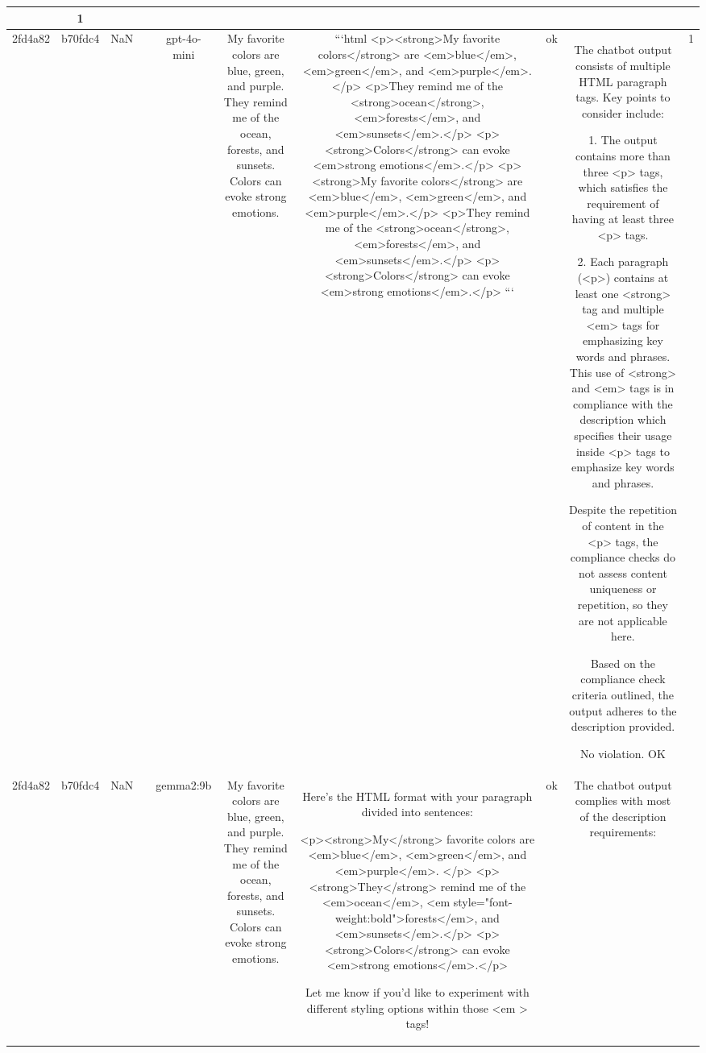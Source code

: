 \begin{table}[h!]
\begin{tabular}{|c|c|c|c|c|c|c|c|c|c|}
{{ERR & 1\\
\hline
2fd4a82 & b70fdc4 & NaN &  & gpt-4o-mini & My favorite colors are blue, green, and purple. They remind me of the ocean, forests, and sunsets. Colors can evoke strong emotions. & ```html
<p><strong>My favorite colors</strong> are <em>blue</em>, <em>green</em>, and <em>purple</em>.</p>
<p>They remind me of the <strong>ocean</strong>, <em>forests</em>, and <em>sunsets</em>.</p>
<p><strong>Colors</strong> can evoke <em>strong emotions</em>.</p>
<p><strong>My favorite colors</strong> are <em>blue</em>, <em>green</em>, and <em>purple</em>.</p>
<p>They remind me of the <strong>ocean</strong>, <em>forests</em>, and <em>sunsets</em>.</p>
<p><strong>Colors</strong> can evoke <em>strong emotions</em>.</p>
``` & ok & The chatbot output consists of multiple HTML paragraph tags. Key points to consider include:

1. The output contains more than three <p> tags, which satisfies the requirement of having at least three <p> tags.

2. Each paragraph (<p>) contains at least one <strong> tag and multiple <em> tags for emphasizing key words and phrases. This use of <strong> and <em> tags is in compliance with the description which specifies their usage inside <p> tags to emphasize key words and phrases.

Despite the repetition of content in the <p> tags, the compliance checks do not assess content uniqueness or repetition, so they are not applicable here.

Based on the compliance check criteria outlined, the output adheres to the description provided.

No violation.
OK & 1\\
\hline
2fd4a82 & b70fdc4 & NaN &  & gemma2:9b & My favorite colors are blue, green, and purple. They remind me of the ocean, forests, and sunsets. Colors can evoke strong emotions. & Here's the HTML format with your paragraph divided into sentences:

<p><strong>My</strong> favorite colors are <em>blue</em>, <em>green</em>, and <em>purple</em>. </p>
<p><strong>They</strong> remind me of the <em>ocean</em>, <em style="font-weight:bold">forests</em>, and <em>sunsets</em>.</p> 
<p><strong>Colors</strong> can evoke <em>strong emotions</em>.</p>



Let me know if you'd like to experiment with different styling options within those <em > tags! & ok & The chatbot output complies with most of the description requirements:

}}
\end{tabular}
\end{table}
